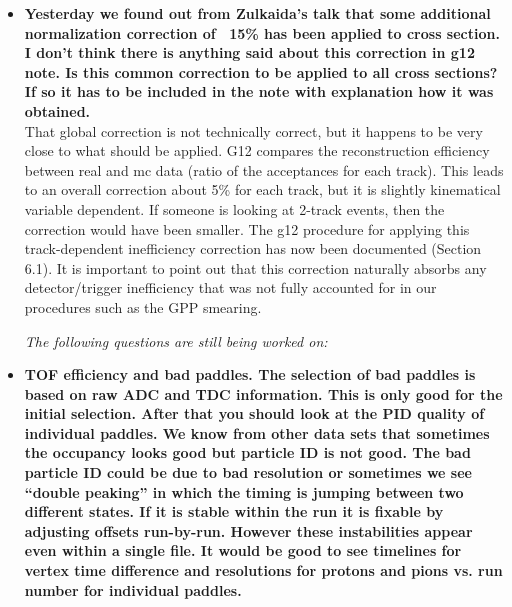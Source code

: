 \documentclass[ 12 pt]{article}
\begin{document}
\begin{itemize}
\item \textbf{Yesterday we found out from Zulkaida's talk that some additional normalization correction of ~15\% has been applied to cross section. I don't think there is anything said about this correction in g12 note. Is this common correction to be applied to all cross sections? If so it has to be included in the note with explanation how it was obtained.}\\

That global correction is not technically correct, but it happens to be very close to what should be applied. G12 compares the reconstruction efficiency between real and mc data (ratio of the acceptances for each track). This leads to an overall correction about 5\% for each track, but it is slightly kinematical variable dependent. If someone is looking at 2-track events, then the correction would have been smaller. The g12 procedure for applying this track-dependent inefficiency correction has now been documented  (Section 6.1). It is important to point out that this correction naturally absorbs any detector/trigger inefficiency that was not fully accounted for in our procedures such as the GPP smearing.



{\it The following questions are still being worked on:}


\item \textbf{TOF efficiency and bad paddles. The selection of bad paddles is based on raw 
ADC and TDC information. This is only good for the initial selection. After 
that you should look at the PID quality of individual paddles. We know from 
other data sets that sometimes the occupancy looks good but particle ID is 
not good. The bad particle ID could be due to bad resolution or sometimes we 
see “double peaking” in which the timing is jumping between two different 
states. If it is stable within the run it is fixable by adjusting offsets run-by-run. 
However these instabilities appear even within a single file. It would be good 
to see timelines for vertex time difference and resolutions for protons and 
pions vs. run number for individual paddles.}\\


\end{itemize}
\end{document}
